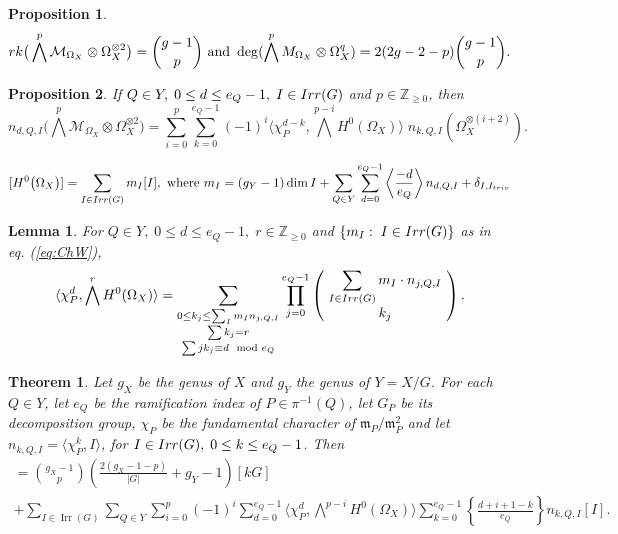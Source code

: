 \documentclass[10pt,a4paper]{amsart}
\newtheorem{theorem}{Theorem}
\newtheorem{lemma}{Lemma}
\newtheorem{proposition}{Proposition}
\begin{document}
\begin{proposition}\label{prop:rkdeg}
\[
{\rm rk}\big(\bigwedge^p\mathcal{M}_{\Omega_X}\otimes \Omega_X^{\otimes 2}\big)
=
\binom{g-1}{p}
\text{ and }
\deg( \bigwedge^p M_{\Omega_X} \otimes \Omega_X^q)=
2(2g-2-p)\binom{g-1}{p}.
\]
\end{proposition}

\begin{proposition}\label{prop:binomial3}
If $Q\in Y,\;0\leq d\leq e_Q-1,\;I\in{\rm Irr}(G)$ and $p\in\mathbb{Z}_{\geq 0}$, then
\[
n_{d,Q,I}\big(\bigwedge^p\mathcal{M}_{\Omega_X}\otimes \Omega_X^{\otimes 2}\big)
=\sum_{i=0}^p
\sum_{k=0}^{e_Q-1}
(-1)^i
\langle
\chi_P^{d-k},
\bigwedge^{p-i}H^0(\Omega_X)
\rangle
\;
n_{k,Q,I}(\Omega_X^{\otimes (i+2)}).
\]
\end{proposition}

\begin{equation}\label{eq:ChW}
[H^0\big(\Omega_X\big)]=\sum_{I\in{\rm Irr}(G)} m_I[I],
\text{ where }
m_I=(g_Y-1)\dim I+\sum_{Q\in Y}\sum_{d=0}^{e_Q-1}\left\langle \frac{-d}{e_Q}\right\rangle n_{d,Q,I}+\delta_{I,I_{\rm triv}}
\end{equation}

\begin{lemma}\label{lem:localwedge}
For $Q\in Y,\;0\leq d\leq e_Q-1,\;r\in\mathbb{Z}_{\geq 0}$ and $\{m_I:\;I\in {\rm Irr}(G)\}$ as in eq. (\ref{eq:ChW}),
\[
\langle 
\chi_P^{d}, \bigwedge^{r}H^0(\Omega_X)
\rangle
=
\sum_{\substack{ 0\leq k_j\leq \sum_{I}m_I n_{j,Q,I}  \\ \sum k_j=r \\ \sum jk_j\equiv d\mod e_Q}}
\prod_{j=0}^{e_Q-1}
\left(\!\begin{array}{c} \displaystyle\sum_{I\in{\rm Irr}(G)}m_I\cdot n_{j,Q,I} \\ k_j \end{array}\!\right).
\]
\end{lemma}

\begin{theorem}\label{th:mainwedge}
Let $g_X$ be the genus of $X$ and $g_Y$ the genus of $Y=X/G$. For each $Q\in Y$, let $e_Q$ be the ramification index of $P\in\pi^{-1}(Q)$, let $G_P$ be its decomposition group, $\chi_P$ be the fundamental character of $\mathfrak{m}_P/\mathfrak{m}_P^2$ and let $n_{k,Q,I}=\langle \chi_P^k,I\rangle$, for $I\in{\rm Irr}(G), \;0\leq k\leq e_Q-1$. Then
\begin{multline*}
[H^0\big(\bigwedge^p\mathcal{M}_{\Omega_X}\otimes\Omega_X^{\otimes 2}\big)]
=
\binom{g_X-1}{p} \left( \frac{2(g_X-1-p)}{|G|}
+
g_Y-1\right)
[kG]\\
  +
\sum_{I \in \operatorname{Irr}(G)} \sum_{Q \in Y} \sum_{i=0}^p (-1)^i \sum_{d=0}^{e_Q-1} 
\langle \chi_P^{d}, \bigwedge^{p-i}H^0(\Omega_X) \rangle 
\sum_{k=0}^{e_Q-1} \left\{ \frac{d+i+1-k}{e_Q} \right\} n_{k,Q,I} [I].
\end{multline*}
\end{theorem}
\end{document}
